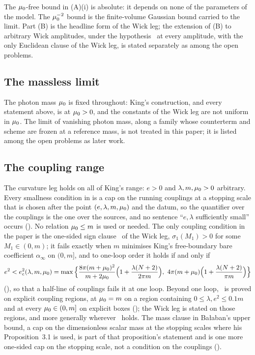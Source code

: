 The $\mu_0$-free bound in (A)(i) is absolute: it depends on none of the parameters of the model. The
$\mu_0^{-2}$ bound is the finite-volume Gaussian bound carried to the limit. Part (B) is the headline form
of the Wick leg; the extension of (B) to arbitrary Wick amplitudes, under the hypothesis \Wtwo\ at every
amplitude, with the only Euclidean clause of the Wick leg, is stated separately as 
among the open problems.

\subsection{The massless limit}

The photon mass $\mu_0$ is fixed throughout: King's construction, and every statement above, is at
$\mu_0>0$, and the constants of the Wick leg are not uniform in $\mu_0$. The limit of vanishing photon mass,
along a family whose counterterm and scheme are frozen at a reference mass, is not treated in this paper;
it is listed among the open problems as later work.

\subsection{The coupling range}

The curvature leg holds on all of King's range: $e>0$ and $\lambda,m,\mu_0>0$ arbitrary. Every smallness
condition in \cite{K1,K2,Ba1,Ba2,Ba3,Ba4} is a cap on the running couplings at a stopping scale that is
chosen after the point $(e,\lambda,m,\mu_0)$ and the datum, so the quantifier over the couplings is the one
over the sources, and no sentence ``$e,\lambda$ sufficiently small'' occurs
(). No relation $\mu_0\le m$ is used or needed. The only coupling
condition in the paper is the one-sided sign clause \Tthree\ of the Wick leg, $\sigma_1(M_1)>0$ for some
$M_1\in(0,m)$; it fails exactly when $m$ minimises King's free-boundary bare coefficient $\alpha_\infty$ on
$(0,m]$, and to one-loop order it holds if and only if
\[
e^2<e_c^2(\lambda,m,\mu_0)=\max\Big\{\frac{8\pi(m+\mu_0)^2}{m+2\mu_0}\Big(1+\frac{\lambda(N+2)}{2\pi m}\Big),\
4\pi(m+\mu_0)\Big(1+\frac{\lambda(N+2)}{\pi m}\Big)\Big\}
\]
(), so that a half-line of couplings fails it at one loop. Beyond one loop, \Tthree\ is
proved on explicit coupling regions, at $\mu_0=m$ on a region containing $0\le\lambda,e^2\le0.1m$ and at
every $\mu_0\in(0,m]$ on explicit boxes (\Cref{prop:s14:T3}); the Wick leg is stated on those regions, and
more generally wherever \Tthree\ holds. The mass clause in Ba{\l}aban's upper bound, a cap on the
dimensionless scalar mass at the stopping scales where his Proposition~3.1 is used, is part of that
proposition's statement and is one more one-sided cap on the stopping scale, not a condition on the
couplings (\Cref{rem:s14:BALm}).

